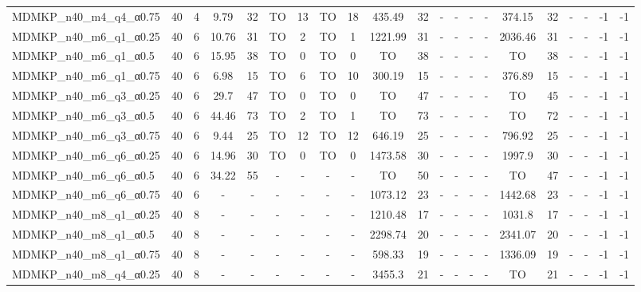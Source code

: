 \begin{sidewaystable}[!ht]
{\begin{tabular}{lcccccccccccccccccccc}
MDMKP\_n40\_m4\_q4\_α0.75 & 40 & 4 &  \textcolor{blue2}{9.79} & 32 & TO & 13 & TO & 18 & 435.49 & 32 &  - &  - &  - &  - & 374.15 & 32 &  - &  - & -1 & -1 \\
MDMKP\_n40\_m6\_q1\_α0.25 & 40 & 6 &  \textcolor{blue2}{10.76} & 31 & TO & 2 & TO & 1 & 1221.99 & 31 &  - &  - &  - &  - & 2036.46 & 31 &  - &  - & -1 & -1 \\
MDMKP\_n40\_m6\_q1\_α0.5 & 40 & 6 &  \textcolor{blue2}{15.95} & 38 & TO & 0 & TO & 0 & TO & 38 &  - &  - &  - &  - & TO & 38 &  - &  - & -1 & -1 \\
MDMKP\_n40\_m6\_q1\_α0.75 & 40 & 6 &  \textcolor{blue2}{6.98} & 15 & TO & 6 & TO & 10 & 300.19 & 15 &  - &  - &  - &  - & 376.89 & 15 &  - &  - & -1 & -1 \\
MDMKP\_n40\_m6\_q3\_α0.25 & 40 & 6 &  \textcolor{blue2}{29.7} & 47 & TO & 0 & TO & 0 & TO & 47 &  - &  - &  - &  - & TO & 45 &  - &  - & -1 & -1 \\
MDMKP\_n40\_m6\_q3\_α0.5 & 40 & 6 &  \textcolor{blue2}{44.46} & 73 & TO & 2 & TO & 1 & TO & 73 &  - &  - &  - &  - & TO & 72 &  - &  - & -1 & -1 \\
MDMKP\_n40\_m6\_q3\_α0.75 & 40 & 6 &  \textcolor{blue2}{9.44} & 25 & TO & 12 & TO & 12 & 646.19 & 25 &  - &  - &  - &  - & 796.92 & 25 &  - &  - & -1 & -1 \\
MDMKP\_n40\_m6\_q6\_α0.25 & 40 & 6 &  \textcolor{blue2}{14.96} & 30 & TO & 0 & TO & 0 & 1473.58 & 30 &  - &  - &  - &  - & 1997.9 & 30 &  - &  - & -1 & -1 \\
MDMKP\_n40\_m6\_q6\_α0.5 & 40 & 6 &  \textcolor{blue2}{34.22} & 55 &  - &  - &  - &  - & TO & 50 &  - &  - &  - &  - & TO & 47 &  - &  - & -1 & -1 \\
MDMKP\_n40\_m6\_q6\_α0.75 & 40 & 6 &  - &  - &  - &  - &  - &  - &  \textcolor{blue2}{1073.12} & 23 &  - &  - &  - &  - & 1442.68 & 23 &  - &  - & -1 & -1 \\
MDMKP\_n40\_m8\_q1\_α0.25 & 40 & 8 &  - &  - &  - &  - &  - &  - & 1210.48 & 17 &  - &  - &  - &  - &  \textcolor{blue2}{1031.8} & 17 &  - &  - & -1 & -1 \\
MDMKP\_n40\_m8\_q1\_α0.5 & 40 & 8 &  - &  - &  - &  - &  - &  - &  \textcolor{blue2}{2298.74} & 20 &  - &  - &  - &  - & 2341.07 & 20 &  - &  - & -1 & -1 \\
MDMKP\_n40\_m8\_q1\_α0.75 & 40 & 8 &  - &  - &  - &  - &  - &  - &  \textcolor{blue2}{598.33} & 19 &  - &  - &  - &  - & 1336.09 & 19 &  - &  - & -1 & -1 \\
MDMKP\_n40\_m8\_q4\_α0.25 & 40 & 8 &  - &  - &  - &  - &  - &  - &  \textcolor{blue2}{3455.3} & 21 &  - &  - &  - &  - & TO & 21 &  - &  - & -1 & -1 \\

\end{tabular}}
\end{sidewaystable}
